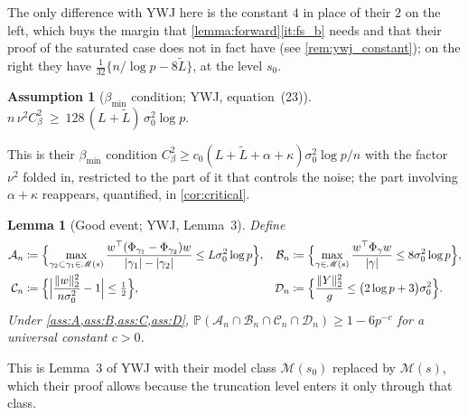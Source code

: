 \documentclass[aos]{imsart}
\DeclarePairedDelimiter{\norm}{\lVert}{\rVert}
\DeclarePairedDelimiter{\abs}{\lvert}{\rvert}
\newcommand{\Ltil}{\widetilde{L}}
\theoremstyle{plain}
\newtheorem{lemma}{Lemma}[section]
\theoremstyle{definition}
\newtheorem{assumption}{Assumption}[section]
\begin{document}
    The only difference with YWJ here is the constant $4$ in place of their
    $2$ on the left, which buys the margin that
    \cref{lemma:forward}\ref{it:fs_b} needs and that their proof of the
    saturated case does not in fact have (see \cref{rem:ywj_constant}); on
    the right they have $\tfrac1{32}\{n/\log p-8\Ltil\}$, at the level $s_0$.

    \begin{assumption}[$\beta_{\min}$ condition; YWJ, equation~(23)]
        \label{ass:betamin}
        $n\,\nu^{2}C_\beta^{2}\ \geq\ 128\,(L+\Ltil)\,\sigma_0^{2}\log p$.
    \end{assumption}

    This is their $\beta_{\min}$ condition
    $C_\beta^{2}\geq c_0(L+\Ltil+\alpha+\kappa)\sigma_0^{2}\log p/n$ with the
    factor $\nu^{2}$ folded in, restricted to the part of it that controls the
    noise; the part involving $\alpha+\kappa$ reappears, quantified, in
    \cref{cor:critical}.

    \begin{lemma}[Good event; YWJ, Lemma~3]
        \label{lemma:good}
        Define
        \begin{align}
            \label{eq:events}
            \mathcal{A}_n&\coloneq\Bigl\{
            \max_{\gamma_2\subset\gamma_1\in\mathscr{M}(s)}
            \frac{w^{\top}(\Phi_{\gamma_1}-\Phi_{\gamma_2})w}
            {\abs{\gamma_1}-\abs{\gamma_2}}
            \leq L\sigma_0^{2}\log p\Bigr\},
            &
            \mathcal{B}_n&\coloneq\Bigl\{
            \max_{\gamma\in\mathscr{M}(s)}
            \frac{w^{\top}\Phi_\gamma w}{\abs{\gamma}}
            \leq 8\sigma_0^{2}\log p\Bigr\},
            \\
            \nonumber
            \mathcal{C}_n&\coloneq\Bigl\{
            \Bigl|\frac{\norm{w}_2^{2}}{n\sigma_0^{2}}-1
            \Bigr|\leq\tfrac12\Bigr\},
            &
            \mathcal{D}_n&\coloneq\Bigl\{
            \frac{\norm{Y}_2^{2}}{g}\leq
            \bigl(2\log p+3\bigr)\sigma_0^{2}\Bigr\} .
        \end{align}
        Under \cref{ass:A,ass:B,ass:C,ass:D},
        $\mathbb{P}(\mathcal{A}_n\cap\mathcal{B}_n\cap\mathcal{C}_n
        \cap\mathcal{D}_n)\geq1-6p^{-c}$ for a universal constant $c>0$.
    \end{lemma}

    This is Lemma~3 of YWJ with their model class $\mathscr{M}(s_0)$ replaced
    by $\mathscr{M}(s)$, which their proof allows because the truncation
    level enters it only through that class.
\end{document}
